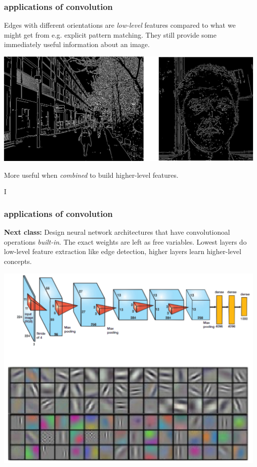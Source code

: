 \documentclass[handout,compress]{beamer}
\begin{document}
	\begin{frame}
	\frametitle{applications of convolution}
	Edges with different orientations are \emph{low-level} features compared to what we might get from e.g. explicit pattern matching. They still provide some immediately useful information about an image.
	\begin{center}
		\includegraphics[width=.5\textwidth]{edge_hint.png}
	\end{center}
More useful when \emph{combined} to build higher-level features.
	
I 	\end{frame}

	\begin{frame}
	\frametitle{applications of convolution}
	\textbf{Next class:} 
	Design neural network architectures that have convolutionoal operations \emph{built-in}. The exact weights are left as free variables. Lowest layers do low-level feature extraction like edge detection, higher layers learn higher-level concepts.
	\begin{center}
		\includegraphics[width=.5\textwidth]{edge_detect.png}
	\end{center}
	
	\end{frame}
\end{document}
